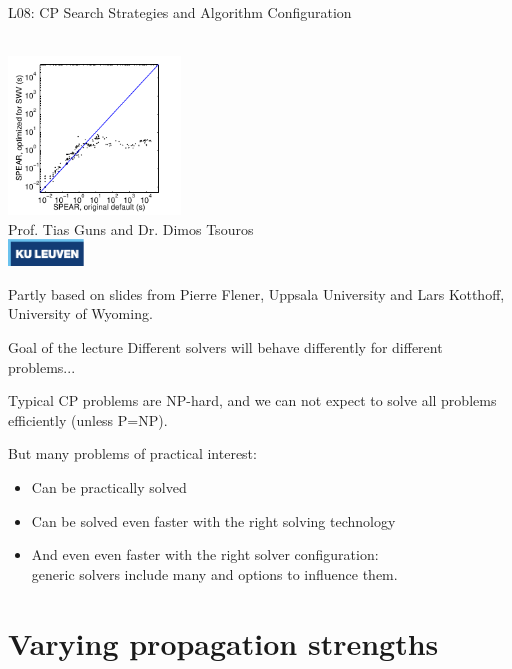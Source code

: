 \documentclass{cons-beamer}
\begin{document}
\begin{frame}{L08: CP Search Strategies and Algorithm Configuration}
  \begin{center}
    ~ \\
    \includegraphics[height=42mm, trim=11px 8px 0 0, clip]{images/speedup} \\
    Prof. Tias Guns and Dr. Dimos Tsouros \\[0.5em]
    \includegraphics[width=2cm]{images/kuleuven_CMYK_logo.pdf}
  \end{center}
  
  {\footnotesize 
  Partly based on slides from Pierre Flener, Uppsala University and Lars Kotthoff, University of Wyoming.}
\end{frame}

\begin{frame}{Goal of the lecture}
  Different solvers will behave differently for different problems...
  \vfill

  Typical CP problems are NP-hard, and we can not expect to solve all problems efficiently (unless P=NP).
  \vfill

  But many problems of practical interest:
  \begin{itemize}
    \item Can be practically solved
    \item Can be solved even faster with the right solving technology
    \item And even even faster with the right solver configuration:\\
          generic solvers include many  and options to influence them.
  \end{itemize}
\end{frame}


\section{Varying propagation strengths}
\end{document}
